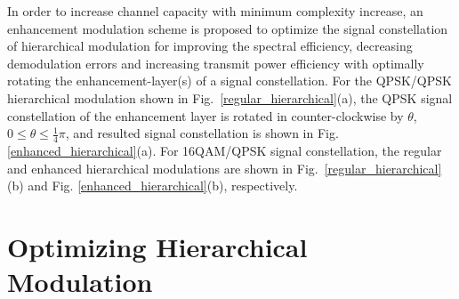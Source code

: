 \documentclass[conference]{IEEEtran}
\begin{document}
In order to increase channel capacity with minimum complexity
increase, an enhancement modulation scheme is proposed to optimize
the signal constellation of hierarchical modulation for improving
the spectral efficiency, decreasing demodulation errors and
increasing transmit power efficiency with optimally rotating the
enhancement-layer(s) of a signal constellation. For the QPSK/QPSK
hierarchical modulation shown in
Fig.~\ref{regular_hierarchical}(a), the QPSK signal constellation
of the enhancement layer is rotated in counter-clockwise by
$\theta$, $0\leq\theta\leq\frac{1}{4}\pi$, and resulted signal
constellation is shown in Fig. \ref{enhanced_hierarchical}(a). For
16QAM/QPSK signal constellation, the regular and enhanced
hierarchical modulations are shown in
Fig.~\ref{regular_hierarchical}(b) and Fig.
\ref{enhanced_hierarchical}(b), respectively.
\begin{figure}
\end{figure}

\section{Optimizing Hierarchical Modulation}
\end{document}
